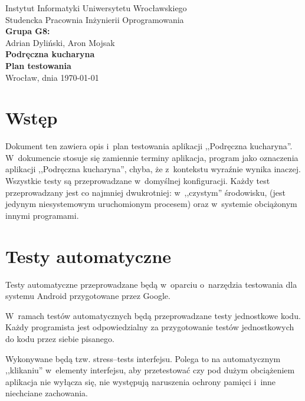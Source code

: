 \documentclass[a4paper,11pt,titlepage,twoside]{mwart}
\begin{document}
\begin{titlepage}
\begin{center}
\large{Instytut Informatyki Uniwersytetu Wrocławskiego\\Studencka Pracownia Inżynierii Oprogramowania}\\[3.0cm]
\Large {\bfseries Grupa G8:}\\
\large Adrian Dyliński, Aron Mojsak\\[4.0cm]
{ \Huge \bfseries Podręczna kucharyna}\\[0.5cm]
{ \large \bfseries Plan testowania}\\
\vfill
{\large Wrocław, dnia \today}
\end{center}
\end{titlepage}
\mbox{}
\thispagestyle{empty}
\newpage
\setcounter{page}{1}
\tableofcontents
\newpage
\section{Wstęp}
Dokument ten zawiera opis i~plan testowania aplikacji ,,Podręczna kucharyna''. W~dokumencie stosuje się zamiennie terminy aplikacja, program jako oznaczenia aplikacji ,,Podręczna kucharyna'', chyba, że z~kontekstu wyraźnie wynika inaczej. Wszystkie testy są przeprowadzane w~domyślnej konfiguracji. Każdy test przeprowadzany jest co najmniej dwukrotniej: w~,,czystym'' środowisku, (jest jedynym niesystemowym uruchomionym procesem) oraz w~systemie obciążonym innymi programami.
\section{Testy automatyczne}
Testy automatyczne przeprowadzane będą w~oparciu o~narzędzia testowania dla systemu Android przygotowane przez Google. 

W~ramach testów automatycznych będą przeprowadzane testy jednostkowe kodu. Każdy programista jest odpowiedzialny za przygotowanie testów jednostkowych do kodu przez siebie pisanego.

Wykonywane będą tzw. stress--tests interfejsu. Polega to na automatycznym ,,klikaniu'' w~elementy interfejsu, aby przetestować czy pod dużym obciążeniem aplikacja nie wyłącza się, nie występują naruszenia ochrony pamięci i~inne niechciane zachowania.
\end{document}
